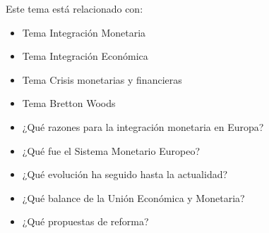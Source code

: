 \documentclass{nuevotema}
\begin{document}
Este tema está relacionado con:
\begin{itemize}
    \item Tema Integración Monetaria
    \item Tema Integración Económica
    \item Tema Crisis monetarias y financieras
    \item Tema Bretton Woods
\end{itemize}

\begin{itemize}
	\item ¿Qué razones para la integración monetaria en Europa?
	\item ¿Qué fue el Sistema Monetario Europeo?
	\item ¿Qué evolución ha seguido hasta la actualidad?
	\item ¿Qué balance de la Unión Económica y Monetaria?
	\item ¿Qué propuestas de reforma?
\end{itemize}

\esquemacorto
\end{document}
